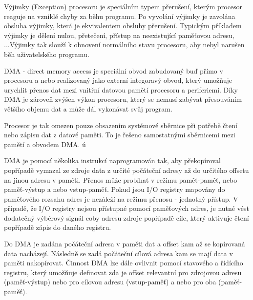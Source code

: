 
Výjimky (Exception) procesoru je speciálním typem přerušení, kterým procesor reaguje na vzniklé chyby za běhu programu. Po vyvolání výjimky je zavolána obsluha výjimky, která je ekvivalentem obsluhy přerušení. Typickým příkladem výjimky je dělení nulou, přetečení, přístup na neexistující paměťovou adresu, ...Výjimky tak slouží k obnovení normálního stavu procesoru, aby nebyl narušen běh uživatelského programu. 










DMA - direct memory access je speciální obvod zabudovaný buď přímo v procesoru a nebo realizovaný jako externí integoravý obvod, který umožňuje urychlit přenos dat mezi vnitřní datovou pamětí procesoru a periferiemi. Díky DMA je zároveň zvýšen výkon procesoru, který se nemusí zabývat přesouváním většího objemu dat a může dál vykonávat svůj program.

\vskip 4mm
\centerline{}
\vskip 4mm

Procesor je tak omezen pouze obsazením systémové sběrnice při potřebě čtení nebo zápisu dat z datové paměti. To je řešeno samostatnými sběrnicemi mezi pamětí a obvodem DMA. 
ú

DMA je pomocí několika instrukcí naprogramován tak, aby překopíroval popřípadě vymazal ze zdroje data z určité počáteční adresy až do určitého offsetu na jinou adresu v paměti. Přenos může probíhat v režimu pamět-paměť, nebo paměť-výstup a nebo vstup-paměť. Pokud jsou I/O registry mapovány do paměťového rozsahu adres je nezáleží na režimu přenosu - jednotný přístup. V případě, že I/O registry nejsou přístupné pomocí paměťových adres, je nutné vést dodatečný výběrový signál coby adresu zdroje popřípadě cíle, který aktivuje čtení popřípadě zápis do daného registru.

Do DMA je zadána počáteční adresa v paměti dat a offset kam až se kopírovaná data nacházejí. Následně se zadá počáteční cílová adresa kam se mají data v paměti nakopírovat. Činnost DMA lze dále ovlivnit pomocí stavového a řídícího registru, který umožňuje definovat zda je offset relevantní pro zdrojovou adresu (paměť-výstup) nebo pro cílovou adresu (vstup-paměť) a nebo pro oba (paměť-paměť). 

